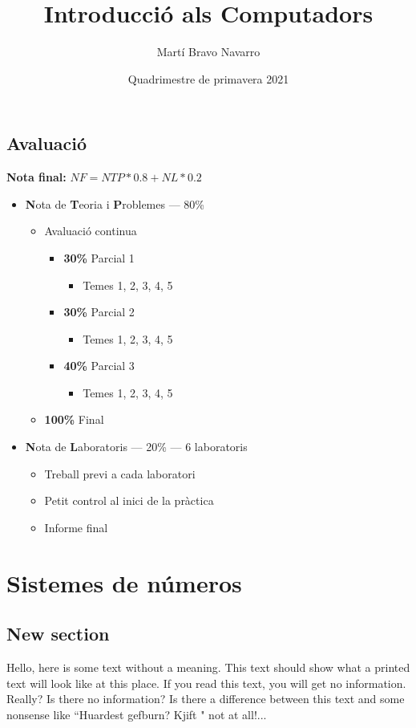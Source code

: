 \documentclass[12pt, a4paper, twoside]{report}
\title{Introducció als Computadors}
\author{Martí Bravo Navarro}
\date{Quadrimestre de primavera 2021}
\begin{document}
\begin{titlepage}
\maketitle
\end{titlepage}

\section*{Avaluació}
\textbf{Nota final:} \(NF = NTP*0.8 + NL*0.2\)
\begin{itemize}
    \item \textbf{N}ota de \textbf{T}eoria i \textbf{P}roblemes --- 80\%
    \begin{itemize}
        \item Avaluació continua
        \begin{itemize}
            \item \textbf{30\%} Parcial 1
        \begin{itemize}
            \item Temes 1, 2, 3, 4, 5
        \end{itemize}
        \item \textbf{30\%} Parcial 2
        \begin{itemize}
            \item Temes 1, 2, 3, 4, 5
        \end{itemize}
        \item \textbf{40\%} Parcial 3
        \begin{itemize}
            \item Temes 1, 2, 3, 4, 5
        \end{itemize}
        
        \end{itemize}
        \item \textbf{100\%} Final
    \end{itemize}
    \item \textbf{N}ota de \textbf{L}aboratoris --- 20\% --- 6 laboratoris
    \begin{itemize}
        \item Treball previ a cada laboratori
        \item Petit control al inici de la pràctica
        \item Informe final
    \end{itemize}
  \end{itemize}

\chapter{Sistemes de números}
\section{New section}

Hello, here is some text without a meaning.  This text should 
show what a printed text will look like at this place.  If you 
read this text, you will get no information.  Really?  Is there 
no information?  Is there a difference between this text and some 
nonsense like ``Huardest gefburn?  Kjift " not at all!...
\end{document}
